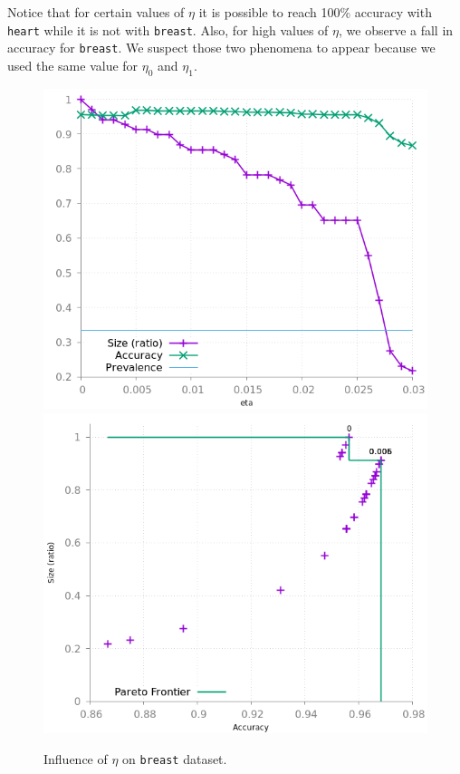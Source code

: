 \documentclass[sigconf,edbt]{acmart-edbt-workshops}
\begin{document}
Notice that for certain values of $\eta$ it is possible to reach 100\% accuracy with \texttt{heart} while it is not with \texttt{breast}. Also, for high values of $\eta$, we observe a fall in accuracy for \texttt{breast}. We suspect those two phenomena to appear because we used the same value for $\eta_0$ and $\eta_1$. 

\begin{figure}[!h]\centering
\includegraphics[scale=0.35]{img/meta_breast.png}
\hfill
\includegraphics[scale=0.35]{img/meta_pareto_breast.png}
\caption{Influence of $\eta$ on \texttt{breast} dataset.}
\label{fig:meta_breast}
\end{figure}
\end{document}
